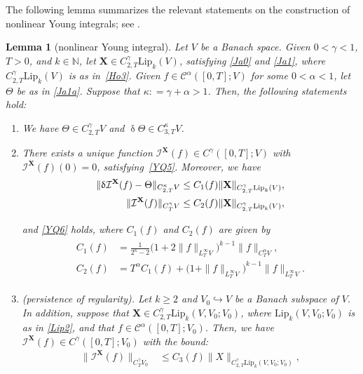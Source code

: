 \documentclass[letterpaper, 11pt,  reqno]{amsart}
\newtheorem{lemma}[theorem]{Lemma}
\newcommand{\1}{\hspace{0.5mm}\textup{I}\hspace{0.5mm}}
\newcommand{\I}{\mathcal{I}}
\newcommand{\noi}{\noindent}
\newcommand{\CC}{\mathcal{C}}
\newcommand{\al}{\alpha}
\newcommand{\updl}{\updelta}
\newcommand{\kk}{\kappa}
\newcommand{\g}{\gamma}
\newcommand{\N}{\mathbb{N}}
\newcommand{\Lip}{\mathrm{Lip}}
\newcommand{\XX}{\mathbf{X}}
\numberwithin{equation}{section}
\numberwithin{theorem}{section}
\begin{document}
The following lemma summarizes
the relevant statements
on the construction of nonlinear Young integrals;
see \cite[Lemma~3.4 and Remark~3.6]{CGLLO1}.
 



\begin{lemma}[nonlinear Young integral]
\label{LEM:int1}
Let $V$ be a Banach space.
Given $0 < \g < 1$, 
 $T>0$, and $k\in \N$,  
let $\XX\in C^\g_{2,T}\Lip_k(V)$, 
satisfying \eqref{Ja0} and \eqref{Ja1}, 
where $C^\g_{2,T}\Lip_k(V)$ is as in~\eqref{Ho3}.
Given 
  $f\in \CC^{\al}([0,T];V)$ for some $0 < \al < 1$, 
let   $\Theta$  be as in \eqref{Ja1a}.
Suppose that 
 $\kk : =  \g +\al > 1$.
Then,  the following statements hold\textup{:}

\smallskip

\begin{enumerate}


\item[(i)] 
We have $\Theta\in C^\g_{2,T}V$
and
$\updl \Theta \in C^\kk_{3,T}V$.




\smallskip

\item[(ii)]
There exists 
a unique function 
$\I^\XX(f) \in C^\g([0,T]; V)$
with  $\I^\XX(f)(0) =0$, satisfying~\eqref{YQ5}.
Moreover,
we have 
\begin{align}
\|\updl \I^\XX(f) - \Theta\|_{C^\kk_{2,T}  V}
& \leq 
C_1(f)
\|\XX\|_{C^\g_{2,T}\Lip_k(V)},
\notag 
\\
\|\I^\XX(f)\|_{C^\g_T  V} 
& \leq
C_2(f)
\|\XX\|_{C^\g_{2,T}\Lip_k(V)}, 
\label{Ja3}
\end{align}


\noi
and \eqref{YQ6} holds, 
where $C_1(f)$ and $C_2(f)$ are given by 
\begin{align}
\begin{split}
C_1(f)
&= 
\frac{1}{2^\kk-2}
\big(1+ 2\|f\|_{ L^\infty_T V}\big)^{k-1} \|f\|_{C^\al_T  V}, \\
C_2 (f)
&=  T^\al C_1(f) + 
\big(1 + \|f\|_{ L^\infty_T V} \big)^{k-1}
\|f\|_{L^\infty_T V}.
\end{split}
\label{Ja3x}
\end{align}

\smallskip

\item[(iii)]
\textup{(persistence of regularity).}
Let  $k \ge 2$ and $V_0 \hookrightarrow V$
be a Banach subspace of $V$.
In addition, suppose that 
 $\XX\in C^\g_{2,T}\Lip_k(V, V_0; V_0)$, 
 where $\Lip_k(V, V_0; V_0)$ is as in \eqref{Lip2}, 
 and that 
   $f\in \CC^{\al}([0,T];V_0)$.
Then, 
we have 
$\I^\XX(f)\in C^\g([0,T]; V_0)$
with the bound\textup{:}
\begin{align*}
\|\I^\XX(f)\|_{C^\g_T  V_0} 
& \leq
C_3(f)
\|X\|_{C^\g_{2,T}\Lip_k(V, V_0; V_0)}, 
\end{align*}


\end{enumerate}
\end{lemma}
\end{document}
